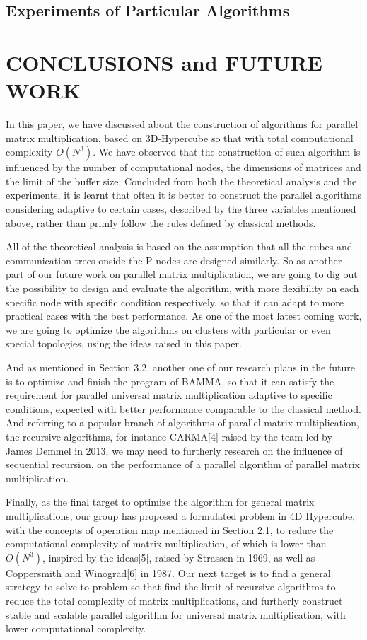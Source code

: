 \documentclass{amsart}
\theoremstyle{definition}
\theoremstyle{remark}
\numberwithin{equation}{section}
\begin{document}
\subsection{Experiments of Particular Algorithms}

\section{CONCLUSIONS and FUTURE WORK}
	In this paper, we have discussed about the construction of algorithms for parallel matrix multiplication, based on 3D-Hypercube so that with total computational complexity $O(N^3)$. We have observed that the construction of such algorithm is influenced by the number of computational nodes, the dimensions of matrices and the limit of the buffer size. Concluded from both the theoretical analysis and the experiments, it is learnt that often it is better to construct the parallel algorithms considering adaptive to certain cases, described by the three variables mentioned above, rather than primly follow the rules defined by classical methods.
	
	All of the theoretical analysis is based on the assumption that all the cubes and communication trees onside the P nodes are designed similarly. So as another part of our future work on parallel matrix multiplication, we are going to dig out the possibility to design and evaluate the algorithm, with more flexibility on each specific node with specific condition respectively, so that it can adapt to more practical cases with the best performance. As one of the most latest coming work, we are going to optimize the algorithms on clusters with particular or even special topologies, using the ideas raised in this paper.
	
	And as mentioned in Section 3.2, another one of our research plans in the future is to optimize and finish the program of BAMMA, so that it can satisfy the requirement for parallel universal matrix multiplication adaptive to specific conditions, expected with better performance comparable to the classical method. And referring to a popular branch of algorithms of parallel matrix multiplication, the recursive algorithms, for instance CARMA[4] raised by the team led by James Demmel in 2013, we may need to furtherly research on the influence of sequential recursion, on the performance of a parallel algorithm of parallel matrix multiplication.
	
	Finally, as the final target to optimize the algorithm for general matrix multiplications, our group has proposed a formulated problem in 4D Hypercube, with the concepts of operation map mentioned in Section 2.1, to reduce the computational complexity of matrix multiplication, of which is lower than $O(N^3)$, inspired by the ideas[5], raised by Strassen in 1969, as well as Coppersmith and Winograd[6] in 1987. Our next target is to find a general strategy to solve to problem so that find the limit of recursive algorithms to reduce the total complexity of matrix multiplications, and furtherly construct stable and scalable parallel algorithm for universal matrix multiplication, with lower computational complexity.
\end{document}
